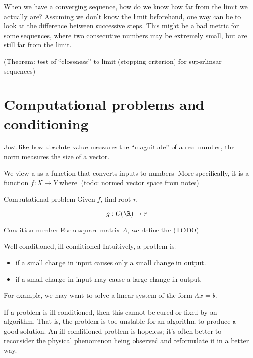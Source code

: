 When we have a converging sequence, how do we know how far from the limit we actually are? Assuming we don't know the limit beforehand, one way can be to look at the difference between successive steps. This might be a bad metric for some sequences, where two consecutive numbers may be extremely small, but are still far from the limit. 

(Theorem: test of ``closeness'' to limit (stopping criterion) for superlinear sequences)

\section{Computational problems and conditioning}
Just like how absolute value measures the ``magnitude'' of a real number, the norm measures the size of a vector.

We view a  as a function that converts inputs to numbers. More specifically, it is a function $f : X \to Y$ where:
(todo: normed vector space from notes)

\begin{exbox}{Computational problem}{}
    Given $f$, find root $r$.

    \[ g : C(\R) \to r \]
\end{exbox}

\begin{dfnbox}{Condition number}{}
    For a square matrix $A$, we define the (TODO)
\end{dfnbox}

\begin{dfnbox}{Well-conditioned, ill-conditioned}{}
    Intuitively, a problem is:
    \begin{itemize}
        \item {} if a small change in input causes only a small change in output.
        \item {} if a small change in input may cause a large change in output.
    \end{itemize}
\end{dfnbox}

For example, we may want to solve a linear system of the form $Ax = b$. 

If a problem is ill-conditioned, then this cannot be cured or fixed by an algorithm. That is, the problem is too unstable for an algorithm to produce a good solution. An ill-conditioned problem is hopeless; it's often better to reconsider the physical phenomenon being observed and reformulate it in a better way.

